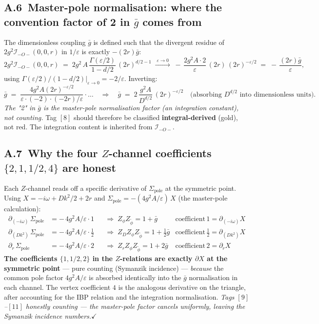 \documentclass[11pt,a4paper]{article}
\newcommand{\ck}[1]{\textcolor{cntcol}{$[#1]$}}
\begin{document}
\subsection*{A.6\ Master-pole normalisation: where the convention factor of 2 in $\bar g$ comes from}

The dimensionless coupling $\bar g$ is defined such that the divergent residue of
$2g^{2}\mathcal I_{-O-}(0,0,r)$ in $1/\varepsilon$ is exactly $-(2r)\bar g$:
\[
2g^{2}\mathcal I_{-O-}(0,0,r) \;=\; 2g^{2}\,A\,\frac{\Gamma(\varepsilon/2)}{1-d/2}\,(2r)^{d/2-1}
\;\xrightarrow{\;\varepsilon\to 0\;}\;
-\,\frac{2g^{2}A\cdot 2}{\varepsilon}\,(2r)\,(2r)^{-\varepsilon/2}
\;=\; -\,\frac{(2r)\bar g}{\varepsilon},
\]
using $\Gamma(\varepsilon/2)/(1-d/2)|_{\varepsilon\to 0} = -2/\varepsilon$. Inverting:
\[
\bar g \;=\; \frac{4 g^{2}A(2r)^{-\varepsilon/2}}{\varepsilon \cdot (-2)\cdot (-2r)/\varepsilon}\cdot\dots
\quad\Rightarrow\quad
\bar g \;=\; 2\,\frac{g^{2}A}{D^{d/2}}\,(2r)^{-\varepsilon/2}
\quad\text{(absorbing }D^{d/2}\text{ into dimensionless units).}
\]
\emph{The "2" in $\bar g$ is the master-pole normalisation factor (an integration
constant), not counting.} Tag \ck{8} should therefore be classified
\textcolor{intcol}{\textbf{integral-derived}} (gold), not red. The integration content is
inherited from $\mathcal I_{-O-}$.

\subsection*{A.7\ Why the four $Z$-channel coefficients $\{2, 1, 1/2, 4\}$ are honest}

Each $Z$-channel reads off a specific derivative of $\Sigma_{\text{pole}}$ at the
symmetric point. Using $X = -i\omega + Dk^{2}/2 + 2r$ and
$\Sigma_{\text{pole}} = -(4g^{2}A/\varepsilon)\,X$ (the master-pole calculation):
\begin{align*}
\partial_{(-i\omega)}\,\Sigma_{\text{pole}} &= -\,4g^{2}A/\varepsilon \cdot 1
& &\Rightarrow\;Z_{\phi}Z_{\widetilde\phi} = 1+\bar g
& \text{coefficient}\,\boxed{1} = \partial_{(-i\omega)}X\\
\partial_{(Dk^{2})}\,\Sigma_{\text{pole}} &= -\,4g^{2}A/\varepsilon \cdot \tfrac{1}{2}
& &\Rightarrow\;Z_{D}Z_{\phi}Z_{\widetilde\phi} = 1+\tfrac{1}{2}\bar g
& \text{coefficient}\,\boxed{\tfrac{1}{2}} = \partial_{(Dk^{2})}X\\
\partial_{r}\,\Sigma_{\text{pole}} &= -\,4g^{2}A/\varepsilon \cdot 2
& &\Rightarrow\;Z_{r}Z_{\phi}Z_{\widetilde\phi} = 1+2\bar g
& \text{coefficient}\,\boxed{2} = \partial_{r}X
\end{align*}
\textbf{The coefficients $\{1, 1/2, 2\}$ in the $Z$-relations are exactly $\partial X$ at
the symmetric point} --- pure counting (Symanzik incidence) --- \emph{because} the
common pole factor $4g^{2}A/\varepsilon$ is absorbed identically into the $\bar g$
normalisation in each channel. The vertex coefficient $4$ is the analogous
derivative on the triangle, after accounting for the IBP relation and the integration
normalisation. \emph{Tags \ck{9}--\ck{11} honestly counting --- the master-pole factor
cancels uniformly, leaving the Symanzik incidence numbers.}\hfill$\checkmark$
\end{document}
